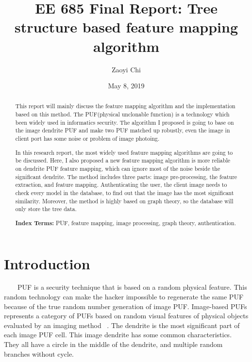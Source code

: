 \documentclass[]{article}   %
\begin{document}
\title{EE 685 Final Report: Tree structure based feature mapping algorithm}   %
\author{Zaoyi Chi}         %
\date{May 8, 2019}    %
\maketitle

\begin{abstract}
   This report will mainly discuss the feature mapping algorithm and the implementation based on this method. The PUF(physical unclonable function) is a technology which been widely used in informatics security. The algorithm I proposed is going to base on the image dendrite PUF and make two PUF matched up robustly, even the image in client port has some noise or problem of image photoing.
   
   In this research report, the most widely used feature mapping algorithms are going to be discussed. Here, I also proposed a new feature mapping algorithm is more reliable on dendrite PUF feature mapping, which can ignore most of the noise beside the significant dendrite. The method includes three parts: image pre-processing, the feature extraction, and feature mapping. Authenticating the user, the client image needs to check every model in the database, to find out that the image has the most significant similarity. Moreover, the method is highly based on graph theory, so the database will only store the tree data.
  
  \textbf{Index Terms:} PUF, feature mapping, image processing, graph theory, authentication.      
\end{abstract}
\section{Introduction}     %
\ \ \ \ PUF is a security technique that is based on a random physical feature. This random technology can make the hacker impossible to regenerate the same PUF because of the true random number generation of image PUF. Image-based PUFs represents a category of PUFs based on random visual features of physical objects evaluated by an imaging method ~\cite{image-basedPUF}. The dendrite is the most significant part of each image PUF cell. This image dendrite has some common characteristics. They all have a circle in the middle of the dendrite, and multiple random branches without cycle.
\end{document}
